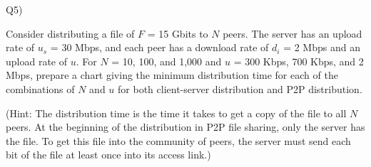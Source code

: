 \documentclass[10pt,letterpaper]{article}
\begin{document}
Q5)

Consider distributing a file of $F$ = 15 Gbits to $N$ peers. The server has an upload
rate of $u_s$ = 30 Mbps, and each peer has a download rate of $d_i$ = 2 Mbps and an
upload rate of $u$. For $N$ = 10, 100, and 1,000 and $u$ = 300 Kbps, 700 Kbps, and
2 Mbps, prepare a chart giving the minimum distribution time for each of
the combinations of $N$ and $u$ for both client-server distribution and P2P
distribution.

(Hint: The distribution time is the time it takes to get a copy of the file to all $N$ peers. At the beginning of the distribution in P2P file sharing, only the server has the file. To get this file
into the community of peers, the server must send each bit of the file at least once
into its access link.)

%
\end{document}
